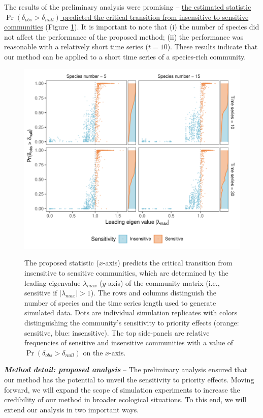 \documentclass[12pt, class=article, crop=false]{standalone}
\begin{document}
The results of the preliminary analysis were promising -- \ul{the estimated statistic $\Pr(\delta_{obs} > \delta_{null})$ predicted the critical transition from insensitive to sensitive communities} (Figure \ref{fig:box}). It is important to note that (i) the number of species did not affect the performance of the proposed method; (ii) the performance was reasonable with a relatively short time series ($t = 10$).
These results indicate that our method can be applied to a short time series of a species-rich community. 

\begin{figure}
    \caption{The proposed statistic ($x$-axis) predicts the critical transition from insensitive to sensitive communities, which are determined by the leading eigenvalue $\lambda_{max}$ ($y$-axis) of the community matrix (i.e., sensitive if $|\lambda_{max}| > 1$).
    The rows and columns distinguish the number of species and the time series length used to generate simulated data.
    Dots are individual simulation replicates with colors distinguishing the community's sensitivity to priority effects (orange: sensitive, blue: insensitive).
    The top side-panels are relative frequencies of sensitive and insensitive communities with a value of $\Pr(\delta_{obs} > \delta_{null})$ on the $x$-axis.}
    \includegraphics[scale=0.7]{output/figure_eigen_scatter.pdf}
    \label{fig:box}
\end{figure}

\textbf{\textit{Method detail: proposed analysis}} -- 
The preliminary analysis ensured that our method has the potential to unveil the sensitivity to priority effects.
Moving forward, we will expand the scope of simulation experiments to increase the credibility of our method in broader ecological situations.
To this end, we will extend our analysis in two important ways.
\end{document}
